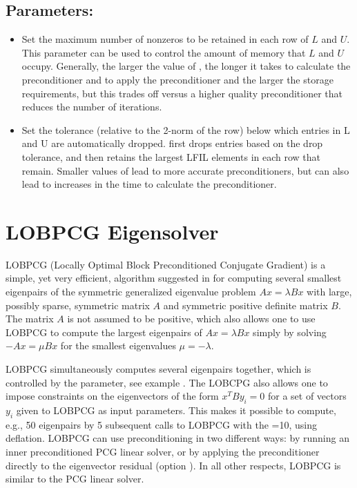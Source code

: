 
\subsection*{Parameters:}

\begin{itemize}

\item
{}
Set the maximum number of nonzeros to be retained in each row of $L$ and $U$.
This parameter can be used to control the amount of memory that $L$ and $U$
occupy. Generally, the larger the value of , the longer it takes to
calculate the preconditioner and to apply the preconditioner and the larger
the storage requirements, but this trades
off versus a higher quality preconditioner that reduces the number of
iterations.

\item
{}
Set the tolerance (relative to the 2-norm of the row) below which entries in L
and U are automatically dropped. \pilut{} first drops entries based on the drop
tolerance, and then retains the largest LFIL elements in each row that remain.
Smaller values of  lead to more accurate preconditioners, but can
also lead to increases in the time to calculate the preconditioner.

\end{itemize}


\section{LOBPCG Eigensolver}

LOBPCG (Locally Optimal Block Preconditioned Conjugate Gradient) is a simple,
yet very efficient, algorithm suggested in \cite{LOBPCG_2001, BLOPEX_2007,
BLOPEXWebPage} for computing several smallest eigenpairs of the symmetric
generalized eigenvalue problem $Ax=\lambda Bx$ with large, possibly sparse,
symmetric matrix $A$ and symmetric positive definite matrix $B$. The matrix $A$
is not assumed to be positive, which also allows one to use LOBPCG to compute
the largest eigenpairs of $Ax=\lambda Bx$ simply by solving $-Ax=\mu Bx$ for the
smallest eigenvalues $\mu=-\lambda$.

LOBPCG simultaneously computes several eigenpairs together, which is controlled
by the  parameter, see example . The LOBCPG also
allows one to impose constraints on the eigenvectors of the form $x^T B y_i=0$
for a set of vectors $y_i$ given to LOBPCG as input parameters. This makes it
possible to compute, e.g., 50 eigenpairs by 5 subsequent calls to LOBPCG with
the =10, using deflation.  LOBPCG can use preconditioning in two
different ways: by running an inner preconditioned PCG linear solver, or by
applying the preconditioner directly to the eigenvector residual (option
).  In all other respects, LOBPCG is similar to the PCG linear
solver.

